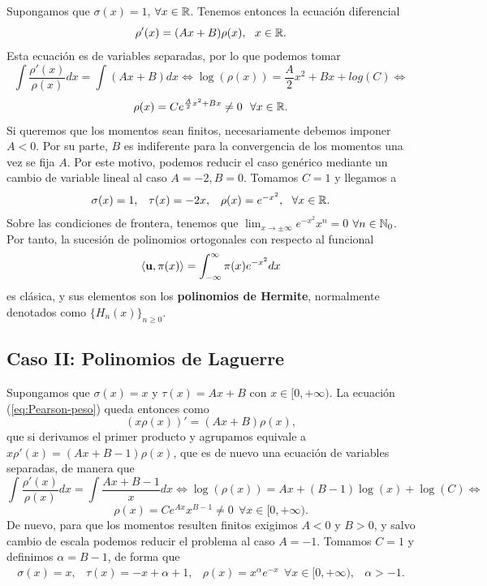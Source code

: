 Supongamos que $\sigma(x)=1$, $\forall x\in \mathbb{R}$. Tenemos entonces la ecuación diferencial
$$
\rho'(x) = (Ax+B) \rho(x), \ \ x\in\mathbb{R}.
$$
Esta ecuación es de variables separadas, por lo que podemos tomar
$$
    \int \dfrac{\rho'(x)}{\rho(x)}dx = \int (Ax+B) dx \Leftrightarrow \log(\rho(x)) = \dfrac A 2 x^2 + B x + log(C) \Leftrightarrow$$ $$ \rho(x) = C e^{\frac A 2 x^2 + B x} \neq 0 \ \ \forall x \in \mathbb{R}.    
$$
Si queremos que los momentos sean finitos, necesariamente debemos imponer $A<0$. Por su parte, $B$ es indiferente para la convergencia de los momentos una vez se fija $A$. Por este motivo, podemos reducir el caso genérico mediante un cambio de variable lineal al caso $A=-2, B=0$. Tomamos $C=1$ y llegamos a 
\begin{equation}
    \label{eq:parametros-hermite}
    \begin{array}{ccc}
        \sigma(x)=1, & \tau(x)=-2x, & \rho(x) = e^{-x^2}, \ \ \forall x \in \R.
    \end{array}
\end{equation}
Sobre las condiciones de frontera, tenemos que $\displaystyle\lim_{x\rightarrow\pm\infty} e^{-x^2}x^n = 0$ $\forall n\in\mathbb{N}_0$. Por tanto, la sucesión de polinomios ortogonales con respecto al funcional
\begin{equation}
    \label{eq:func-hermite}
    \left\langle \mathbf{u} , \pi(x) \right\rangle = \int_{-\infty}^\infty \pi(x)e^{-x^2}dx
\end{equation}
es clásica, y sus elementos son los \textbf{polinomios de Hermite}, normalmente denotados como $\{H_n(x)\}_{n\geq 0}$.

\subsection{Caso II: Polinomios de Laguerre}

 

Supongamos que $\sigma(x) = x$ y $\tau(x)=Ax+B$ con $x\in[0,+\infty)$. La ecuación (\ref{eq:Pearson-peso}) queda entonces como
$$
(x\rho(x))'=(Ax+B)\rho(x),
$$
que si derivamos el primer producto y agrupamos equivale a $x\rho'(x)=(Ax+B-1)\rho(x)$, que es de nuevo una ecuación de variables separadas, de manera que
$$
\int \dfrac{\rho'(x)}{\rho(x)}dx = \int \dfrac{Ax+B-1}{x}dx \Leftrightarrow \log(\rho(x)) = Ax+(B-1)\log(x) + \log(C)\Leftrightarrow $$ $$
 \rho(x) = Ce^{Ax}x^{B-1}\neq 0 \ \ \forall x\in[0,+\infty).
$$
De nuevo, para que los momentos resulten finitos exigimos $A<0$ y $B>0$, y salvo cambio de escala podemos reducir el problema al caso $A=-1$. Tomamos $C=1$ y definimos $\alpha = B-1$, de forma que
\begin{equation}
    \label{eq:parametros-laguerre}
    \begin{array}{cccc}
        \sigma(x)=x, & \tau(x)=-x+\alpha+1, & \rho(x) = x^{\alpha} e^{-x}\ \ \forall x \in[0,+\infty), & \alpha > -1.
    \end{array}
\end{equation}


